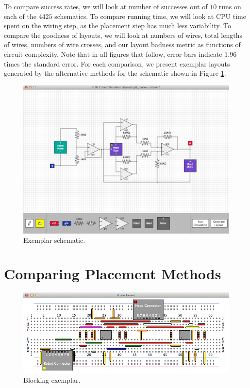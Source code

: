 To compare success rates, we will look at number of successes out of $10$ runs
on each of the $4425$ schematics. To compare running time, we will look at CPU
time spent on the wiring step, as the placement step has much less variability.
To compare the goodness of layouts, we will look at numbers of wires, total
lengths of wires, numbers of wire crosses, and our layout badness metric as
functions of circuit complexity. Note that in all figures that follow,
error bars indicate $1.96$ times the standard error. For each comparison,
we present exemplar layouts generated by the alternative methods for the
schematic shown in Figure \ref{fig:exemplar_schematic}.

\begin{figure}
\begin{center}
\includegraphics[width=\textwidth]{Images/exemplar_schematic.png}
\caption{Exemplar schematic.}
\label{fig:exemplar_schematic}
\end{center}
\end{figure}

\section{Comparing Placement Methods}
\label{sec:compare_placement}

\begin{figure}[H]
\begin{center}
\includegraphics[width=\textwidth]{Images/exemplar_per_pair_decreasing.png}
\caption{Blocking exemplar.}
\end{center}
\end{figure}

